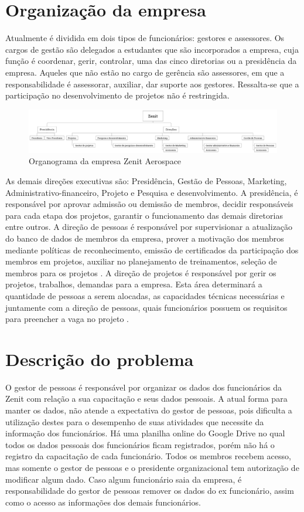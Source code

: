 \section{Organização da empresa}
Atualmente é dividida em dois tipos de funcionários: gestores e assessores. Os cargos de gestão são delegados a estudantes que são incorporados a empresa, cuja função é coordenar, gerir, controlar, uma das cinco diretorias ou a presidência da empresa. Aqueles que não estão no cargo de gerência são assessores, em que a responsabilidade é assessorar, auxiliar, dar suporte aos gestores. Ressalta-se que a participação no desenvolvimento de projetos não é restringida.
\begin{figure}[h]
	\centering
	\label{zenitOrganograma}
		\includegraphics[keepaspectratio=true,scale=0.3]{figuras/zenitOrganograma.eps}
	\caption{Organograma da empresa Zenit Aerospace}
\end{figure}
As demais direções executivas são: Presidência, Gestão de Pessoas, Marketing, Administrativo-financeiro, Projeto e Pesquisa e desenvolvimento.
A presidência, é responsável por aprovar admissão ou demissão de membros, decidir responsáveis para cada etapa dos projetos, garantir o funcionamento das demais diretorias entre outros\cite{regimentoZenit}. 
A direção de pessoas é responsável por supervisionar a atualização do banco de dados de membros da empresa, prover a motivação dos membros mediante políticas de reconhecimento, emissão de certificados da participação dos membros em projetos, auxiliar no planejamento de treinamentos, seleção de membros para os projetos \cite{regimentoZenit}. 
A direção de projetos é responsável por gerir os projetos, trabalhos, demandas para a empresa. Esta área determinará a quantidade de pessoas a serem alocadas, as capacidades técnicas necessárias e juntamente com a direção de pessoas, quais funcionários possuem os requisitos para preencher a vaga no projeto \cite{regimentoZenit}.
\section[Descrição do problema]{Descrição do problema}
O gestor de pessoas é responsável por organizar os dados dos funcionários da Zenit com relação a sua capacitação e seus dados pessoais. A atual forma para manter os dados, não atende a expectativa do gestor de pessoas, pois dificulta a utilização destes para o desempenho de suas atividades que necessite da informação dos funcionários. Há uma planilha online do Google Drive no qual todos os dados pessoais dos funcionários ficam registrados, porém não há o registro da capacitação de cada funcionário. Todos os membros recebem acesso, mas somente  o gestor de pessoas e o presidente organizacional tem autorização de modificar algum dado. Caso algum funcionário saia da empresa, é responsabilidade do gestor de pessoas remover os dados do ex funcionário, assim como o acesso as informações dos demais funcionários.


